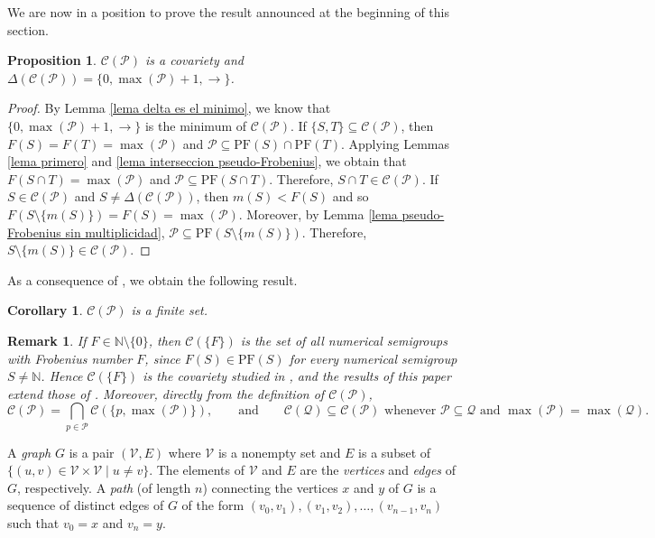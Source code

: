 \documentclass[11pt]{article}
\def\N{\mathbb{N}}
\newtheorem{proposition}[theorem]{Proposition}
\newtheorem{corollary}[theorem]{Corollary}
\newtheorem{remark}[theorem]{Remark}
\numberwithin{equation}{section}
\newcommand{\CP}{\mathcal C(\mathcal P)}
\newcommand{\PF}{\mathrm{PF}}
\begin{document}
We are now in a position to prove the result announced at the beginning of this section.

\begin{proposition}\label{proposicion C es una covariedad}
    $\mathcal C(\mathcal P)$ is a covariety and $\Delta(\mathcal C(\mathcal P))=\{0,\max(\mathcal P)+1,\rightarrow\}$.
\end{proposition}

\begin{proof}
    By Lemma \ref{lema delta es el minimo}, we know that $\{0,\max(\mathcal P)+1,\rightarrow\}$ is the minimum of $\mathcal C(\mathcal P)$. If $\{S,T\}\subseteq\mathcal C(\mathcal P)$, then $F(S)=F(T)=\max(\mathcal P)$ and $\mathcal P\subseteq\mathrm{PF}(S)\cap\mathrm{PF}(T)$. Applying Lemmas \ref{lema primero} and \ref{lema interseccion pseudo-Frobenius}, we obtain that $F(S\cap T)=\max(\mathcal P)$ and $\mathcal P\subseteq\mathrm{PF}(S\cap T)$. Therefore, $S\cap T\in\mathcal C(\mathcal P)$. If $S\in\mathcal C(\mathcal P)$ and $S\ne\Delta(\mathcal C(\mathcal P))$, then $m(S)<F(S)$ and so $F(S\setminus\{m(S)\})=F(S)=\max(\mathcal P)$. Moreover, by Lemma \ref{lema pseudo-Frobenius sin multiplicidad}, $\mathcal P\subseteq \mathrm{PF}(S\setminus\{m(S)\})$. Therefore, $S\setminus\{m(S)\}\in\mathcal C(\mathcal P)$.
\end{proof}

As a consequence of \cite[Proposition 2.1]{covariedades}, we obtain the following result.

\begin{corollary}
    $\mathcal C(\mathcal P)$ is a finite set.
\end{corollary}

\begin{remark}\label{nota frobenius}
If $F\in\N\setminus\{0\}$, then $\mathcal C(\{F\})$ is the set of all numerical semigroups with Frobenius number $F$, since $F(S)\in\PF(S)$ for every numerical semigroup $S\neq\N$. Hence $\mathcal C(\{F\})$ is the covariety studied in \cite{covariedades}, and the results of this paper extend those of \cite{covariedades}. Moreover, directly from the definition of $\CP$,
\[
\CP=\bigcap_{p\in\mathcal P}\mathcal C(\{p,\max(\mathcal P)\}),
\qquad\text{and}\qquad
\mathcal C(\mathcal Q)\subseteq\CP \text{ whenever } \mathcal P\subseteq\mathcal Q \text{ and } \max(\mathcal P)=\max(\mathcal Q).
\]
\end{remark}

A \textit{graph} $G$ is a pair $(\mathcal V,E)$ where $\mathcal{V}$ is a nonempty set and $E$ is a subset of $\{(u,v)\in\mathcal V\times\mathcal{V} \mid u\ne v\}$. The elements of $\mathcal V$ and $E$ are the \textit{vertices} and \textit{edges} of $G$, respectively. A \textit{path} (of length $n$) connecting the vertices $x$ and $y$ of $G$ is a sequence of distinct edges of $G$ of the form $(v_0,v_1),(v_1,v_2),\ldots,(v_{n-1},v_n)$ such that $v_0=x$ and $v_n=y$.
\end{document}
